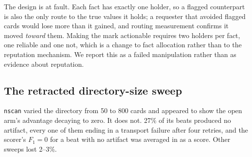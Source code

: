 The design is at fault. Each fact has exactly one holder, so a flagged counterpart is
also the only route to the true values it holds; a requester that avoided flagged cards
would lose more than it gained, and routing measurement confirms it moved \emph{toward}
them. Making the mark actionable requires two holders per fact, one reliable and one not,
which is a change to fact allocation rather than to the reputation mechanism. We report
this as a failed manipulation rather than as evidence about reputation.

\subsection{The retracted directory-size sweep}
\label{app:retracted}

\texttt{nscan} varied the directory from 50 to 800 cards and appeared to show the open
arm's advantage decaying to zero. It does not. 27\% of its beats produced no artifact,
every one of them ending in a transport failure after four retries, and the scorer's
$F_1=0$ for a beat with no artifact was averaged in as a score. Other sweeps lost 2--3\%.

